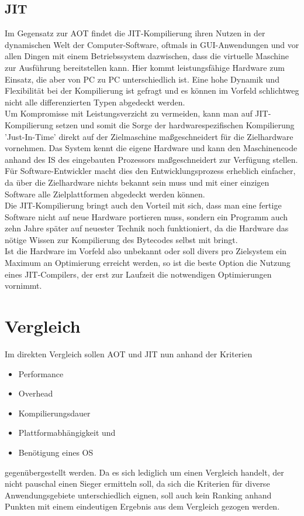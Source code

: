 \subsection{JIT}
Im Gegensatz zur \ac{AOT} findet die \ac{JIT}-Kompilierung ihren Nutzen in der dynamischen Welt der Computer-Software, oftmals in \ac{GUI}-Anwendungen und vor allen Dingen mit einem Betriebssystem dazwischen, dass die virtuelle Maschine zur Ausführung bereitstellen kann. Hier kommt leistungsfähige Hardware zum Einsatz, die aber von PC zu PC unterschiedlich ist. Eine hohe Dynamik und Flexibilität bei der Kompilierung ist gefragt und es können im Vorfeld schlichtweg nicht alle differenzierten Typen abgedeckt werden. \\
Um Kompromisse mit Leistungsverzicht zu vermeiden, kann man auf \ac{JIT}-Kompilierung setzen und somit die Sorge der hardwarespezifischen Kompilierung 'Just-In-Time' direkt auf der Zielmaschine maßgeschneidert für die Zielhardware vornehmen. Das System kennt die eigene Hardware und kann den Maschinencode anhand des \ac{IS} des eingebauten Prozessors maßgeschneidert zur Verfügung stellen. Für Software-Entwickler macht dies den Entwicklungsprozess erheblich einfacher, da über die Zielhardware nichts bekannt sein muss und mit einer einzigen Software alle Zielplattformen abgedeckt werden können. \\
Die \ac{JIT}-Kompilierung bringt auch den Vorteil mit sich, dass man eine fertige Software nicht auf neue Hardware portieren muss, sondern ein Programm auch zehn Jahre später auf neuester Technik noch funktioniert, da die Hardware das nötige Wissen zur Kompilierung des Bytecodes selbst mit bringt.\\
Ist die Hardware im Vorfeld also unbekannt oder soll divers pro Zielsystem ein Maximum an Optimierung erreicht werden, so ist die beste Option die Nutzung eines \ac{JIT}-Compilers, der erst zur Laufzeit die notwendigen Optimierungen vornimmt.

\section{Vergleich}
Im direkten Vergleich sollen \ac{AOT} und \ac{JIT} nun anhand der Kriterien
\begin{itemize} 
    \item Performance
    \item Overhead
    \item Kompilierungsdauer
    \item Plattformabhängigkeit und
    \item Benötigung eines \ac{OS}
\end{itemize}
gegenübergestellt werden. Da es sich lediglich um einen Vergleich handelt, der nicht pauschal einen Sieger ermitteln soll, da sich die Kriterien für diverse Anwendungsgebiete unterschiedlich eignen, soll auch kein Ranking anhand Punkten mit einem eindeutigen Ergebnis aus dem Vergleich gezogen werden. \\

